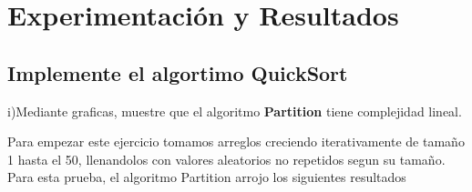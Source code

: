 \documentclass[spanish]{article}
\begin{document}
	\newpage	

	\bigskip
\section{Experimentaci\'on y Resultados}
	
	\subsection{Implemente el algortimo QuickSort}
	
	{\large i)Mediante graficas, muestre que el algoritmo {\bf Partition} tiene complejidad lineal.}\\
	
	\bigskip

	Para empezar este ejercicio tomamos arreglos creciendo iterativamente de tamaño 1 hasta el 50, llenandolos con valores 			aleatorios no repetidos segun su tamaño.
	Para esta prueba, el algoritmo Partition arrojo los siguientes resultados
\end{document}
